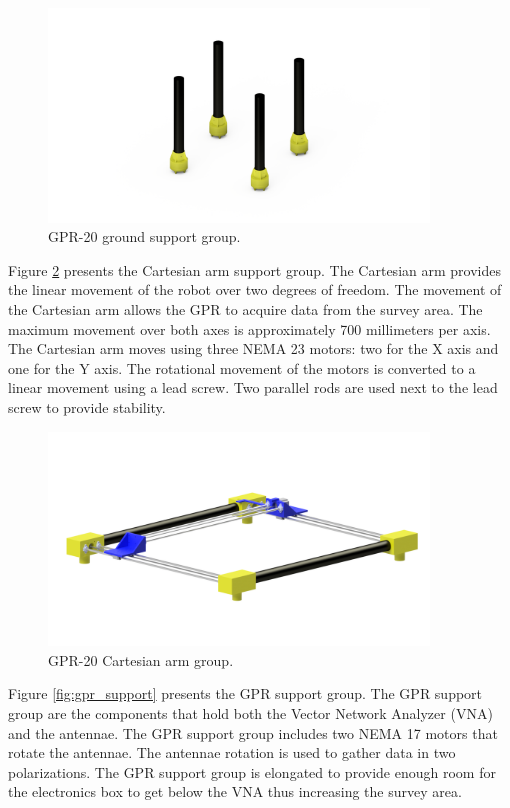 \documentclass{article}
\begin{document}
\begin{figure}[h]
    \centering
    \includegraphics[width=0.9\textwidth]{images/groups/ground_group.png}
    \caption{GPR-20 ground support group.}
    \label{fig:ground_support}
\end{figure}

Figure \ref{fig:cartesian_arm} presents the Cartesian arm support group. The Cartesian arm provides the linear movement of the robot over two degrees of freedom. The movement of the Cartesian arm allows the GPR to acquire data from the survey area. The maximum movement over both axes is approximately 700 millimeters per axis. The Cartesian arm moves using three NEMA 23 motors: two for the X axis and one for the Y axis. The rotational movement of the motors is converted to a linear movement using a lead screw. Two parallel rods are used next to the lead screw to provide stability.

\begin{figure}[h]
    \centering
    \includegraphics[width=0.9\textwidth]{images/groups/cartesian_arm.png}
    \caption{GPR-20 Cartesian arm group.}
    \label{fig:cartesian_arm}
\end{figure}

Figure \ref{fig:gpr_support} presents the GPR support group. The GPR support group are the components that hold both the Vector Network Analyzer (VNA) and the antennae. The GPR support group includes two NEMA 17 motors that rotate the antennae. The antennae rotation is used to gather data in two polarizations. The GPR support group is elongated to provide enough room for the electronics box to get below the VNA thus increasing the survey area.
\end{document}
